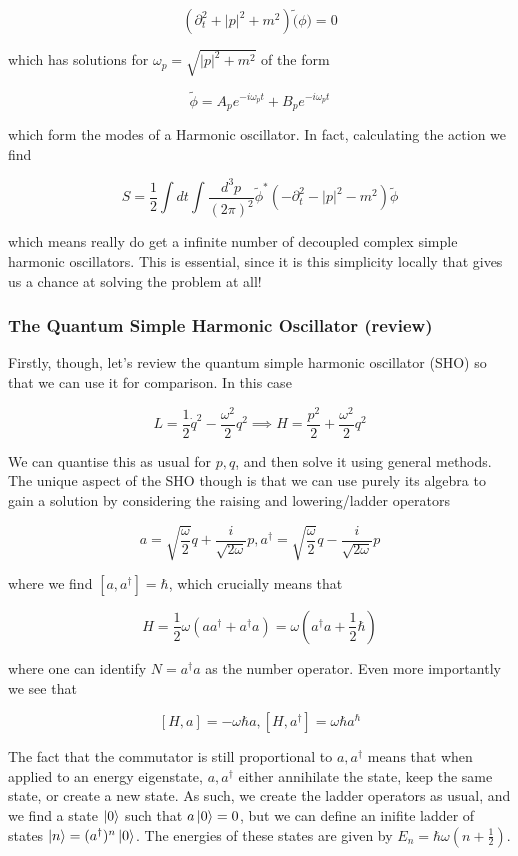 \documentclass{article}
\theoremstyle{definition}
\begin{document}
$$ (\partial_t^2 + |p|^2 + m^2) \tilde(\phi) = 0 $$

which has solutions for $\omega_p = \sqrt{|p|^2 + m^2}$ of the form

$$ \tilde{\phi} = A_p e^{-i\omega_p t} + B_p e^{-i\omega_p t} $$

which form the modes of a Harmonic oscillator. In fact, calculating the action
we find

$$ S = \frac{1}{2} \int dt \int \frac{d^3p}{(2\pi)^2} \tilde{\phi}^*
(-\partial_t^2 - |p|^2 - m^2) \tilde{\phi} $$

which means really do get a infinite number of decoupled complex simple harmonic
oscillators. This is essential, since it is this simplicity locally that gives
us a chance at solving the problem at all!

\subsubsection{The Quantum Simple Harmonic Oscillator (review)}

Firstly, though, let's review the quantum simple harmonic oscillator (SHO) so
that we can use it for comparison. In this case

$$ L = \frac{1}{2} \dot{q}^2 - \frac{\omega^2}{2} q^2 \implies H = \frac{p^2}{2}
+ \frac{\omega^2}{2}q^2 $$

We can quantise this as usual for $p, q$, and then solve it using general
methods. The unique aspect of the SHO though is that we can use purely its
algebra to gain a solution by considering the raising and lowering/ladder
operators

$$ a = \sqrt{\frac{\omega}{2}} q + \frac{i}{\sqrt{2\omega}} p, a^\dagger =
\sqrt{\frac{\omega}{2}} q - \frac{i}{\sqrt{2\omega}} p $$

where we find $[a, a^\dagger] = \hbar$, which crucially means that

$$ H = \frac{1}{2}\omega(aa^\dagger + a^\dagger a) = \omega(a^\dagger a +
\frac{1}{2}\hbar) $$

where one can identify $N = a^\dagger a$ as the number operator. Even more
importantly we see that

$$ [H, a] = - \omega \hbar a, [H, a^\dagger] = \omega \hbar a^\hbar $$

The fact that the commutator is still proportional to $a, a^\dagger$ means that
when applied to an energy eigenstate, $a, a^\dagger$ either annihilate the
state, keep the same state, or create a new state. As such, we create the ladder
operators as usual, and we find a state $\ket{0}$ such that $a\ket{0} = 0$, but
we can define an inifite ladder of states $\ket{n} = (a^\dagger)^n \ket{0}$. The
energies of these states are given by $E_n = \hbar \omega(n + \frac{1}{2})$. 
\end{document}
